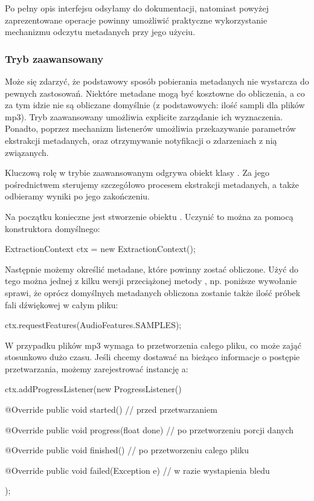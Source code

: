 Po pełny opis interfejsu  odsyłamy do dokumentacji, natomiast powyżej
zaprezentowane operacje powinny umożliwić praktyczne wykorzystanie mechanizmu odczytu metadanych
przy jego użyciu.

\subsubsection{Tryb zaawansowany}

Może się zdarzyć, że podstawowy sposób pobierania metadanych nie wystarcza do pewnych zastosowań.
Niektóre metadane mogą być kosztowne do obliczenia, a co za tym idzie nie są obliczane domyślnie (z
podstawowych: ilość sampli dla plików mp3). Tryb zaawansowany umożliwia explicite zarządanie ich
wyznaczenia. Ponadto, poprzez mechanizm listenerów umożliwia przekazywanie parametrów ekstrakcji
metadanych, oraz otrzymywanie notyfikacji o zdarzeniach z nią związanych.

Kluczową rolę w trybie zaawansowanym odgrywa obiekt klasy . Za jego
pośrednictwem sterujemy szczegółowo procesem ekstrakcji metadanych, a także odbieramy wyniki po jego
zakończeniu.

Na początku konieczne jest stworzenie obiektu . Uczynić to można za pomocą
konstruktora domyślnego:

\begin{java}
ExtractionContext ctx = new ExtractionContext();
\end{java}

Następnie możemy określić metadane, które powinny zostać obliczone. Użyć do tego można jednej z
kilku wersji przeciążonej metody , np. poniższe wywołanie sprawi, że oprócz
domyślnych metadanych obliczona zostanie także ilość próbek fali dźwiękowej w całym pliku:

\begin{java}
ctx.requestFeatures(AudioFeatures.SAMPLES);
\end{java}

W przypadku plików mp3 wymaga to przetworzenia całego pliku, co może zająć stosunkowo dużo czasu.
Jeśli chcemy dostawać na bieżąco informacje o postępie przetwarzania, możemy zarejestrować instancję
a:

\begin{java}
ctx.addProgressListener(new ProgressListener() {

    @Override
    public void started() {
        // przed przetwarzaniem
    }

    @Override
    public void progress(float done) {
        // po przetworzeniu porcji danych
    }

    @Override
    public void finished() {
        // po przetworzeniu calego pliku
    }

    @Override
    public void failed(Exception e) {
        // w razie wystapienia bledu
    }
});
\end{java}

